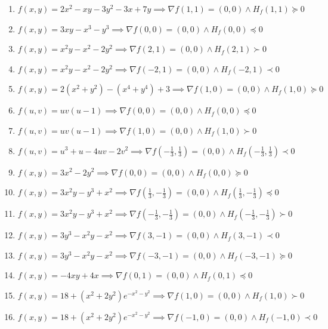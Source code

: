 \documentclass[11pt,a4paper]{article}
\begin{document}
\begin{enumerate}
\item $\displaystyle f(x, y) = 2x^{2} - xy - 3y^{2} - 3x + 7y \implies \nabla f(1, 1) = (0, 0) \land H_{f}(1, 1) \succeq 0$
\item $\displaystyle f(x, y) = 3xy - x^{3} - y^{3} \implies \nabla f(0, 0) = (0, 0) \land H_{f}(0, 0) \preceq 0$
\item $\displaystyle f(x, y) = x^{2} y - x^{2} - 2y^{2} \implies \nabla f(2, 1) = (0, 0) \land H_{f}(2, 1) \succ 0$
\item $\displaystyle f(x, y) = x^{2} y - x^{2} - 2y^{2} \implies \nabla f(-2, 1) = (0, 0) \land H_{f}(-2, 1) \prec 0$
\item $\displaystyle f(x, y) = 2(x^{2} + y^{2}) - (x^{4} + y^{4}) + 3 \implies \nabla f(1, 0) = (0, 0) \land H_{f}(1, 0) \succeq 0$
\item $\displaystyle f(u, v) = u v (u - 1) \implies \nabla f(0, 0) = (0, 0) \land H_{f}(0, 0) \preceq 0$
\item $\displaystyle f(u, v) = u v (u - 1) \implies \nabla f(1, 0) = (0, 0) \land H_{f}(1, 0) \succ 0$
\item $\displaystyle f(u, v) = u^{3} + u - 4uv - 2v^{2} \implies \nabla f\left( -\frac{1}{3}, \frac{1}{3} \right) = (0, 0) \land H_{f}\left( -\frac{1}{3}, \frac{1}{3} \right) \prec 0$
\item $\displaystyle f(x, y) = 3x^{2} - 2y^{2} \implies \nabla f(0, 0) = (0, 0) \land H_{f}(0, 0) \succeq 0$
\item $\displaystyle f(x, y) = 3x^{2} y - y^{3} + x^{2} \implies \nabla f\left( \frac{1}{3}, -\frac{1}{3} \right) = (0, 0) \land H_{f}\left( \frac{1}{3}, -\frac{1}{3} \right) \preceq 0$
\item $\displaystyle f(x, y) = 3x^{2} y - y^{3} + x^{2} \implies \nabla f\left( -\frac{1}{3}, -\frac{1}{3} \right) = (0, 0) \land H_{f}\left( -\frac{1}{3}, -\frac{1}{3} \right) \succ 0$
\item $\displaystyle f(x, y) = 3y^{3} - x^{2} y - x^{2} \implies \nabla f(3, -1) = (0, 0) \land H_{f}(3, -1) \prec 0$
\item $\displaystyle f(x, y) = 3y^{3} - x^{2} y - x^{2} \implies \nabla f(-3, -1) = (0, 0) \land H_{f}(-3, -1) \succeq 0$
\item $\displaystyle f(x, y) = -4xy + 4x \implies \nabla f(0, 1) = (0, 0) \land H_{f}(0, 1) \preceq 0$
\item $\displaystyle f(x, y) = 18 + (x^{2} + 2y^{2}) e^{-x^{2} - y^{2}} \implies \nabla f(1, 0) = (0, 0) \land H_{f}(1, 0) \succ 0$
\item $\displaystyle f(x, y) = 18 + (x^{2} + 2y^{2}) e^{-x^{2} - y^{2}} \implies \nabla f(-1, 0) = (0, 0) \land H_{f}(-1, 0) \prec 0$

\end{enumerate}
\end{document}
